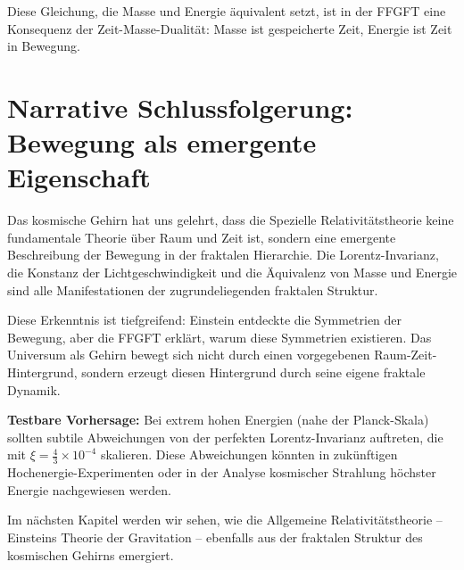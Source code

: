 Diese Gleichung, die Masse und Energie äquivalent setzt, ist in der FFGFT eine Konsequenz der Zeit-Masse-Dualität: Masse ist gespeicherte Zeit, Energie ist Zeit in Bewegung.

\section*{Narrative Schlussfolgerung: Bewegung als emergente Eigenschaft}

Das kosmische Gehirn hat uns gelehrt, dass die Spezielle Relativitätstheorie keine fundamentale Theorie über Raum und Zeit ist, sondern eine emergente Beschreibung der Bewegung in der fraktalen Hierarchie. Die Lorentz-Invarianz, die Konstanz der Lichtgeschwindigkeit und die Äquivalenz von Masse und Energie sind alle Manifestationen der zugrundeliegenden fraktalen Struktur.

Diese Erkenntnis ist tiefgreifend: Einstein entdeckte die Symmetrien der Bewegung, aber die FFGFT erklärt, warum diese Symmetrien existieren. Das Universum als Gehirn bewegt sich nicht durch einen vorgegebenen Raum-Zeit-Hintergrund, sondern erzeugt diesen Hintergrund durch seine eigene fraktale Dynamik.

\textbf{Testbare Vorhersage:} Bei extrem hohen Energien (nahe der Planck-Skala) sollten subtile Abweichungen von der perfekten Lorentz-Invarianz auftreten, die mit $\xi = \frac{4}{3} \times 10^{-4}$ skalieren. Diese Abweichungen könnten in zukünftigen Hochenergie-Experimenten oder in der Analyse kosmischer Strahlung höchster Energie nachgewiesen werden.

Im nächsten Kapitel werden wir sehen, wie die Allgemeine Relativitätstheorie -- Einsteins Theorie der Gravitation -- ebenfalls aus der fraktalen Struktur des kosmischen Gehirns emergiert.



